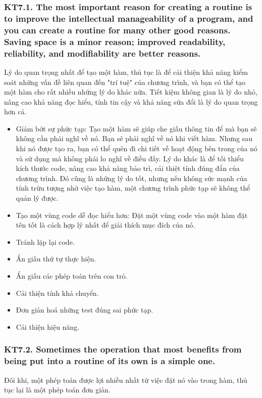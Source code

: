\documentclass[12pt]{report}
\begin{document}
\subsubsection{KT7.1. The most important reason for creating a routine is to improve the intellectual manageability of a program, and you can create a routine for many other good reasons. Saving space is a minor reason; improved readability, reliability, and modifiability are better reasons.}
Lý do quan trọng nhất để tạo một hàm, thủ tục là để cải thiện khả năng kiểm soát những vấn đề liên quan đến "trí tuệ" của chương trình, và bạn có thể tạo một hàm cho rất nhiều những lý do khác nữa. Tiết kiệm không gian là lý do nhỏ, nâng cao khả năng đọc hiểu, tính tin cậy và khả năng sửa đổi là lý do quan trọng hơn cả.
\vspace*{3mm}

\begin{itemize}
	\item Gỉảm bớt sự phức tạp: Tạo một hàm sẽ giúp che giấu thông tin để mà bạn sẽ không cần phải nghĩ về nó. Bạn sẽ phải nghĩ về nó khi viết hàm. Nhưng sau khi nó được tạo ra, bạn có thể quên đi chi tiết về hoạt động bên trong của nó và sử dụng mà không phải lo nghĩ về điều đấy. Lý do khác là để tối thiểu kích thước code, nâng cao khả năng bảo trì, cải thiệt tính đúng đắn của chương trình. Đó cũng là những lý do tốt, nhưng nếu không sức mạnh của tính trừu tượng nhờ việc tạo hàm, một chương trình phức tạp sẽ không thể quản lý được. 
	\item Tạo một vùng code dễ đọc hiểu hơn: Đặt một vùng code vào một hàm đặt tên tốt là cách hợp lý nhất để giải thích mục đích của nó. 
	\item Tránh lặp lại code.
	\item Ẩn giấu thứ tự thực hiện. 
	\item Ẩn giấu các phép toán trên con trỏ. 
	\item Cải thiện tính khả chuyển. 
	\item Đơn giản hoá những test đúng sai phức tạp.
	\item Cải thiện hiệu năng. 
	
\end{itemize}


\subsubsection{KT7.2. Sometimes the operation that most benefits from being put into a routine of its own is a simple one.}
Đôi khi, một phép toán được lợi nhiều nhất từ việc đặt nó vào trong hàm, thủ tục lại là một phép toán đơn giản. 
\vspace*{3mm}
\end{document}
